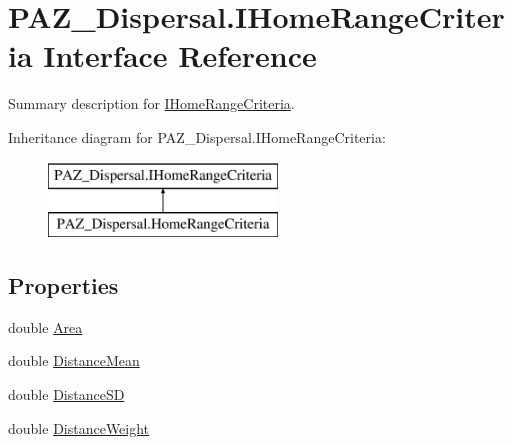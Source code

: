 \hypertarget{interface_p_a_z___dispersal_1_1_i_home_range_criteria}{\section{P\-A\-Z\-\_\-\-Dispersal.\-I\-Home\-Range\-Criteria Interface Reference}
\label{interface_p_a_z___dispersal_1_1_i_home_range_criteria}
}


Summary description for \hyperlink{interface_p_a_z___dispersal_1_1_i_home_range_criteria}{I\-Home\-Range\-Criteria}.  


Inheritance diagram for P\-A\-Z\-\_\-\-Dispersal.\-I\-Home\-Range\-Criteria\-:\begin{figure}[H]
\begin{center}
\leavevmode
\includegraphics[height=2.000000cm]{interface_p_a_z___dispersal_1_1_i_home_range_criteria}
\end{center}
\end{figure}
\subsection*{Properties}
\begin{DoxyCompactItemize}
\item 
double \hyperlink{interface_p_a_z___dispersal_1_1_i_home_range_criteria_a963667778e9f47bbd9e224bf45baa95d}{Area}
\item 
double \hyperlink{interface_p_a_z___dispersal_1_1_i_home_range_criteria_a0109f85283b25b0de64066555b35f1cb}{Distance\-Mean}
\item 
double \hyperlink{interface_p_a_z___dispersal_1_1_i_home_range_criteria_adf9eccf2118ee525a08456765214edd6}{Distance\-S\-D}
\item 
double \hyperlink{interface_p_a_z___dispersal_1_1_i_home_range_criteria_acfb4d7a7f1ec27a5eeeff4ca3864a894}{Distance\-Weight}
\end{DoxyCompactItemize}


